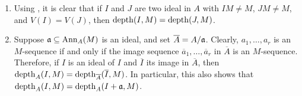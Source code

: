 \begin{remark}
\begin{enumerate}[label=(\roman*)]
    \item Using , it is clear that if $I$ and $J$ are two ideal in $A$ with $IM\ne M$, $JM\ne M$, and $V(I) = V(J)$, then $\operatorname{depth}(I, M) = \operatorname{depth}(J, M)$.
    \item Suppose $\mathfrak{a}\subseteq\operatorname{Ann}_A(M)$ is an ideal, and set $\overline A = A/\mathfrak{a}$. Clearly, $a_1,\dots,a_r$ is an $M$-sequence if and only if the image sequence $\overline a_1,\dots,\overline a_r$ in $\overline A$ is an $M$-sequence. Therefore, if $I$ is an ideal of $I$ and $\overline I$ its image in $\overline A$, then $\operatorname{depth}_A(I, M) = \operatorname{depth}_{\overline A}(\overline I, M)$. In particular, this also shows that $\operatorname{depth}_A(I, M) = \operatorname{depth}_A(I + \mathfrak{a}, M)$.
\end{enumerate}
\end{remark}

